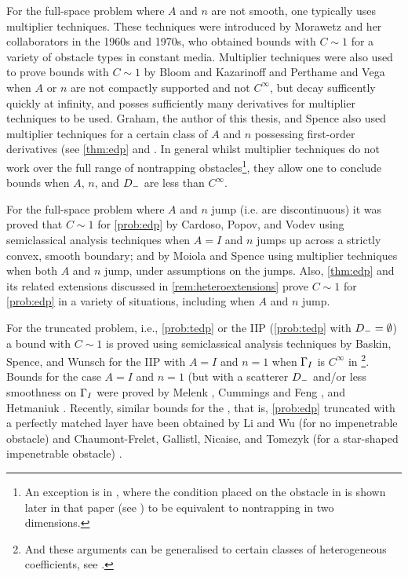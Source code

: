 For the full-space problem where $A$ and $n$ are not smooth, one typically uses multiplier techniques. These techniques were introduced by Morawetz and her collaborators in the 1960s and 1970s, who obtained bounds with $C \sim 1$ for a variety of obstacle types \cite{Mo:61,MoLu:68,Mo:75,MoRaSt:77} in constant media. Multiplier techniques were also used to prove bounds with $C \sim 1$ by Bloom and Kazarinoff \cite{Bl:73,BlKa:77} and Perthame and Vega \cite{PeVe:99} when $A$ or $n$ are not compactly supported and not $C^\infty$, but decay sufficently quickly at infinity, and posses sufficiently many derivatives for multiplier techniques to be used. Graham, the author of this thesis, and Spence also used multiplier techniques for a certain class of $A$ and $n$ possessing first-order derivatives (see \cref{thm:edp} and \cite{GrPeSp:19}. In general whilst multiplier techniques do not work over the full range of nontrapping obstacles\footnote{An exception is in \cite{Mo:75}, where the condition placed on the obstacle in \cite[Equation (1.3)]{Mo:75} is shown later in that paper (see \cite[Equation (1.3a)]{Mo:75}) to be equivalent to nontrapping in two dimensions.}, they allow one to conclude bounds when $A$, $n$, and $D_{-}$ are less than $C^\infty.$

For the full-space problem where $A$ and $n$ jump (i.e. are discontinuous) it was proved that $C \sim 1$ for \cref{prob:edp} by Cardoso, Popov, and Vodev \cite{CaPoVo:99,PoVo:99b} using semiclassical analysis techniques when $A=I$ and $n$ jumps up across a strictly convex, smooth boundary; and by Moiola and Spence \cite{MoSp:19} using multiplier techniques when both $A$ and $n$ jump, under assumptions on the jumps. Also, \cref{thm:edp} and its related extensions discussed in \cref{rem:heteroextensions} prove $C \sim 1$ for \cref{prob:edp} in a variety of situations, including when $A$ and $n$ jump.


For the truncated problem, i.e., \cref{prob:tedp} or the IIP (\cref{prob:tedp} with $D_{-}=\emptyset$) a bound with $C \sim 1$ is proved using semiclassical analysis techniques by Baskin, Spence, and Wunsch for the IIP with $A=I$ and $n=1$ when $\Gamma_{I}$ is $C^\infty$ in \cite{BaSpWu:16}\footnote{And these arguments can be generalised to certain classes of heterogeneous coefficients, see \cite[Remark 5.6]{BaSpWu:16}.}. Bounds for the case $A=I$ and $n=1$ (but with a scatterer $D_{-}$ and/or less smoothness on $\Gamma_{I}$ were proved by Melenk \cite{Me:95}, Cummings and Feng \cite{CuFe:06}, and Hetmaniuk \cite{He:07}. Recently, similar bounds for the , that is, \cref{prob:edp} truncated with a perfectly matched layer have been obtained by Li and Wu \cite{LiWu:19} (for no impenetrable obstacle) and Chaumont-Frelet, Gallistl, Nicaise, and Tomezyk (for a star-shaped impenetrable obstacle) \cite{ChGaNiTo:18}.

